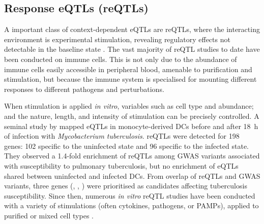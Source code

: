 \subsection{Response eQTLs (reQTLs)}
\label{subsec:intro_reQTL}

A important class of context-dependent \glspl{eQTL} are \glspl{reQTL}, 
where the interacting environment is experimental stimulation,
revealing regulatory effects not detectable in the baseline state \autocite{vandiedonck2017GeneticAssociationMolecular,huang2019GeneticsGeneExpression}.
The vast majority of \gls{reQTL} studies to date have been conducted on immune cells. 
This is not only due to the abundance of immune cells easily accessible in peripheral blood, amenable to purification and stimulation,
but because the immune system is specialised for mounting different responses to different pathogens and perturbations.

When stimulation is applied \textit{in vitro}, variables such as cell type and abundance; and the nature, length, and intensity of stimulation can be precisely controlled.
%
A seminal study by \textcite{barreiro2012DecipheringGeneticArchitecture} mapped \glspl{eQTL} in monocyte-derived \glspl{DC} before and after \SI{18}{\hour} of infection with \textit{Mycobacterium tuberculosis}.
\glspl{reQTL} were detected for 198 genes: 102 specific to the uninfected state and 96 specific to the infected state. 
They observed a 1.4-fold enrichment of \glspl{reQTL} among \gls{GWAS} variants associated with susceptibility to pulmonary tuberculosis,
but no enrichment of \glspl{eQTL} shared between uninfected and infected \glspl{DC}.
From overlap of \glspl{reQTL} and \gls{GWAS} variants,
three genes (, , ) were prioritised as candidates affecting tuberculosis susceptibility.
Since then, numerous \textit{in vitro} \gls{reQTL} studies have been conducted with a variety of stimulations (often cytokines, pathogens, or \glspl{PAMP}),
applied to purified \autocite{fairfax2014InnateImmuneActivity,kim2014CharacterizingGeneticBasis,hu2014RegulationGeneExpression,lee2014CommonGeneticVariants,caliskan2015HostGeneticVariation,quach2016GeneticAdaptationNeandertal,kim-hellmuth2017GeneticRegulatoryEffects,alasoo2018SharedGeneticEffects,gate2018GeneticDeterminantsCoaccessible,schmiedel2018ImpactGeneticPolymorphisms,alasoo2019GeneticEffectsPromoter,calderon2019LandscapeStimulationresponsiveChromatin,devries2020IntegratingGWASBulk,huang2020NeonatalGeneticsGene}
or mixed cell types \autocite{caliskan2015HostGeneticVariation,manry2017DecipheringGeneticControl}.

